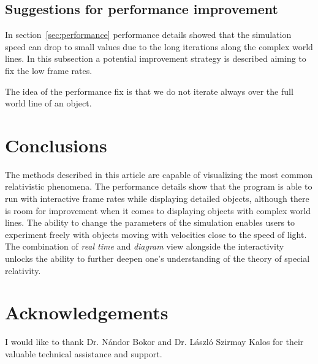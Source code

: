 \documentclass{egpubl}
\begin{document}
\subsection{Suggestions for performance improvement}
\label{sec:performance_improvement}
In section~\ref{sec:performance} performance details showed that the simulation speed can drop to small values due to the long iterations along the complex world lines. In this subsection a potential improvement strategy is described aiming to fix the low frame rates.

The idea of the performance fix is that we do not iterate always over the full world line of an object.

\section{Conclusions}
\label{sec:concl}
The methods described in this article are capable of visualizing the most common relativistic phenomena. The performance details show that the program is able to run with interactive frame rates while displaying detailed objects, although there is room for improvement when it comes to displaying objects with complex world lines. The ability to change the parameters of the simulation enables users to experiment freely with objects moving with velocities close to the speed of light. The combination of \emph{real time} and  \emph{diagram} view alongside the interactivity unlocks the ability to further deepen one's understanding of the theory of special relativity.

\section*{Acknowledgements}
I would like to thank Dr. Nándor Bokor and Dr. László Szirmay Kalos for their valuable technical assistance and support.
\end{document}
